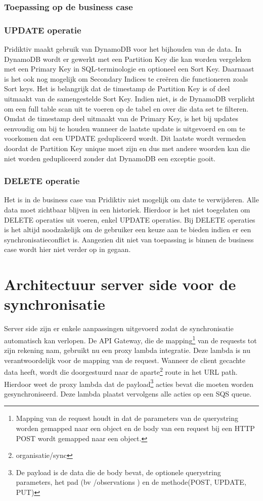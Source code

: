 \subsubsection{Toepassing op de business case}
\subsubsection{UPDATE operatie}
Pridiktiv maakt gebruik van DynamoDB voor het bijhouden van de data. In DynamoDB wordt er gewerkt met een Partition Key die kan worden vergeleken met een Primary Key in SQL-terminologie en optioneel een Sort Key. Daarnaast is het ook nog mogelijk om Secondary Indices te cre\"eren die functioneren zoals Sort keys.  Het is belangrijk dat de timestamp de Partition Key is of deel uitmaakt van de samengestelde Sort Key. Indien niet, is de DynamoDB verplicht om een full table scan uit te voeren op de tabel en over die data set te filteren. Omdat de timestamp deel uitmaakt van de Primary Key, is het bij updates eenvoudig om bij te houden wanneer de laatste update is uitgevoerd en om te voorkomen dat een UPDATE gedupliceerd wordt. Dit laatste wordt vermeden doordat de Partition Key unique moet zijn en dus met andere woorden kan die niet worden gedupliceerd zonder dat DynamoDB een exceptie gooit.
\subsubsection{DELETE operatie}
Het is in de business case van Pridiktiv niet mogelijk om date te verwijderen. Alle data moet zichtbaar blijven in een historiek. Hierdoor is het niet toegelaten om DELETE operaties uit voeren, enkel UPDATE operaties. Bij DELETE operaties is het altijd noodzakelijk om de gebruiker een keuze aan te bieden indien er een synchronisatieconflict is. Aangezien dit niet van toepassing is binnen de business case wordt hier niet verder op in gegaan.

\section{Architectuur server side voor de synchronisatie}
Server side zijn er enkele aanpassingen uitgevoerd zodat de synchronisatie automatisch kan verlopen. De API Gateway, die de mapping\footnote{Mapping van de request houdt in dat de parameters van de querystring worden gemapped naar een object en de body van een request bij een HTTP POST wordt gemapped naar een object.} van de requests tot zijn rekening nam, gebruikt nu een proxy lambda integratie. Deze lambda is nu verantwoordelijk voor de mapping van de request. Wanneer de client gecachte data heeft, wordt die doorgestuurd naar de aparte\footnote{ organisatie/sync } route in het URL path. Hierdoor weet de proxy lambda dat de payload\footnote{De payload is de data die de body bevat, de optionele querystring parameters, het pad (bv /observations ) en de methode(POST, UPDATE, PUT)} acties bevat die moeten worden gesynchroniseerd. Deze lambda plaatst vervolgens alle acties op een SQS queue. 

